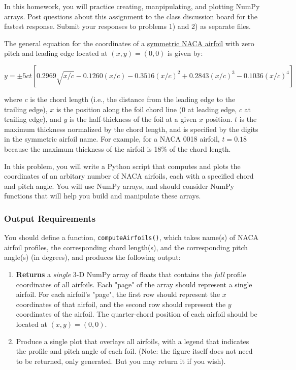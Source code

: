 \documentclass{homework}
\begin{document}
\maketitle

In this homework, you will practice creating, manpipulating, and plotting NumPy arrays. Post questions about this assignment to the class discussion board for the fastest response. Submit your responses to problems 1) and 2) as separate files.


The general equation for the coordinates of a \href{https://en.wikipedia.org/wiki/NACA_airfoil}{symmetric NACA airfoil} with zero pitch and leading edge located at $(x,y) = (0,0)$ is given by:

\begin{equation}
    y = \pm 5ct [0.2969\sqrt{x/c} - 0.1260(x/c) - 0.3516(x/c)^2 + 0.2843(x/c)^3 - 0.1036(x/c)^4]
\end{equation}

where $c$ is the chord length (i.e., the distance from the leading edge to the trailing edge), $x$ is the position along the foil chord line (0 at leading edge, $c$ at trailing edge), and $y$ is the half-thickness of the foil at a given $x$ position. $t$ is the maximum thickness normalized by the chord length, and is specified by the digits in the symmetric airfoil name. For example, for a NACA 0018 airfoil, $t = 0.18$ because the maximum thickness of the airfoil is 18\% of the chord length.

In this problem, you will write a Python script that computes and plots the coordinates of an arbitary number of NACA airfoils, each with a specified chord and pitch angle. You will use NumPy arrays, and should consider NumPy functions that will help you build and manipulate these arrays.

\subsubsection*{Output Requirements}

You should define a function, \texttt{computeAirfoils()}, which takes name(s) of NACA airfoil profiles, the corresponding chord length(s), and the corresponding pitch angle(s) (in degrees), and produces the following output:
\begin{enumerate}
    \item \textbf{Returns} a \textit{single} 3-D NumPy array of floats that contains the \textit{full} profile coordinates of all airfoils. Each "page" of the array should represent a single airfoil. For each airfoil's "page", the first row should represent the $x$ coordinates of that airfoil, and the second row should represent the $y$ coordinates of the airfoil. The quarter-chord position of each airfoil should be located at $(x,y) = (0,0)$.
    \item Produce a single plot that overlays all airfoils, with a legend that indicates the profile and pitch angle of each foil. (Note: the figure itself does not need to be returned, only generated. But you may return it if you wish).
\end{enumerate}
\end{document}
